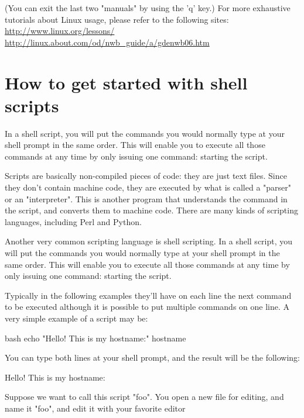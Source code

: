(You can exit the last two "manuals" by using the 'q' key.)
For more exhaustive tutorials about Linux usage, please refer to the following sites:
\url{http://www.linux.org/lessons/}
\url{http://linux.about.com/od/nwb\_guide/a/gdenwb06.htm}

\section{How to get started with shell scripts}

In a shell script, you will put the commands you would normally type at your
shell prompt in the same order. This will enable you to execute all those
commands at any time by only issuing one command: starting the script.

Scripts are basically non-compiled pieces of code: they are just text files.
Since they don't contain machine code, they are executed by what is called a
"parser" or an "interpreter". This is another program that understands the
command in the script, and converts them to machine code. There are many kinds
of scripting languages, including Perl and Python.

Another very common scripting language is shell scripting. In a shell script,
you will put the commands you would normally type at your shell prompt in the
same order. This will enable you to execute all those commands at any time by
only issuing one command: starting the script.

Typically in the following examples they'll have on each line the next command
to be executed although it is possible to put multiple commands on one line. A
very simple example of a script may be:

\begin{code}{bash}
echo "Hello! This is my hostname:"
hostname
\end{code}

You can type both lines at your shell prompt, and the result will be the following:
\begin{prompt}
Hello! This is my hostname:
\end{prompt}

Suppose we want to call this script "foo". You open a new file for editing, and
name it "foo", and edit it with your favorite editor

\begin{prompt}
\end{prompt}


